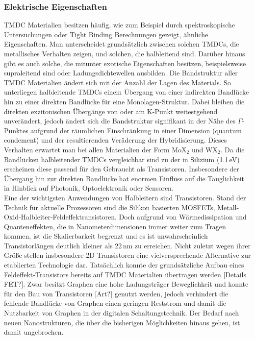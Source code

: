 \subsubsection*{Elektrische Eigenschaften}
TMDC Materialien besitzen häufig, wie zum Beispiel durch spektroskopische Untersuchungen oder Tight Binding Berechnungen gezeigt, ähnliche Eigenschaften. Man unterscheidet grundsätzlich zwischen solchen TMDCs, die metallisches Verhalten zeigen, und solchen, die halbleitend sind. Darüber hinaus gibt es auch solche, die mitunter exotische Eigenschaften besitzen, beispielsweise supraleitend sind oder Ladungsdichtewellen ausbilden. Die Bandstruktur aller TMDC Materialien ändert sich mit der Anzahl der Lagen des Materials. So unterliegen halbleitende TMDCs einem Übergang von einer indirekten Bandlücke hin zu einer direkten Bandlücke für eine Monolagen-Struktur. Dabei bleiben die direkten exzitonischen Übergänge von \mos oder \ws am K-Punkt weitestgehend unverändert, jedoch ändert sich die Bandstruktur signifikant in der Nähe des $\Gamma$-Punktes aufgrund der räumlichen Einschränkung in einer Dimension (quantum condement) und der  resultierenden Veräderung der Hybridisierung. Dieses Verhalten erwartet man bei allen Materialien der Form MoX$_2$ und WX$_2$. Da die Bandlücken halbleitender TMDCs vergleichbar sind zu der in Silizium (1.1\,eV) erscheinen diese passend für den Gebraucht als Transistoren. Insbesondere der Übergang hin zur direkten Bandlücke hat enormen Einfluss auf die Tauglichkeit in Hinblick auf Photonik, Optoelektronik oder Sensoren. \\

Eine der wichtigsten Anwendungen von Halbleitern sind Transistoren. Stand der Technik für aktuelle Prozessoren sind die Silikon basierten MOSFETs, Metall-Oxid-Halbleiter-Feldeffektransistoren. Doch aufgrund von Wärmedissipation und Quanteneffekten, die in Nanometerdimensionen immer weiter zum Tragen kommen, ist die Skalierbarkeit begrenzt und es ist unwahrscheinlich Transistorlängen deutlich kleiner als 22\,nm zu erreichen. Nicht zuletzt wegen ihrer Größe stellen insbesondere 2D Transistoren eine vielversprechende Alternative zur etablierten Technologie dar. Tatsächlich konnte der grundsätzliche Aufbau eines Feldeffekt-Transistors bereits auf TMDC Materialien übertragen werden [Details FET?]. Zwar besitzt Graphen eine hohe Ladungsträger Beweglichkeit und konnte für den Bau von Transistoren [Art?] genutzt werden, jedoch verhindert die fehlende Bandlücke von Graphen einen geringen Reststrom und damit die Nutzbarkeit von Graphen in der digitalen Schaltungstechnik. Der Bedarf nach neuen Nanostrukturen, die über die bisherigen Möglichkeiten hinaus gehen, ist damit ungebrochen. \\ 

